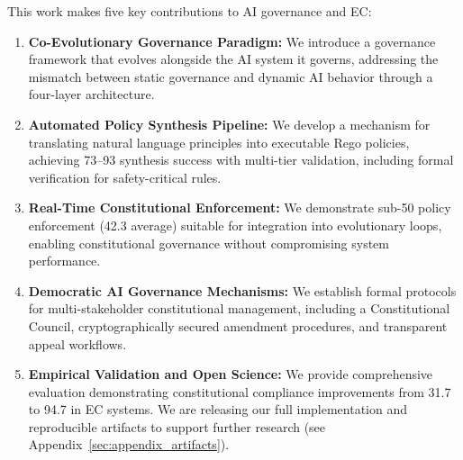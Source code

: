 This work makes five key contributions to AI governance and EC\@:
\begin{enumerate}[leftmargin=*,topsep=2pt,itemsep=2pt,parsep=0pt]
    \item \textbf{Co-Evolutionary Governance Paradigm:} We introduce a governance framework that evolves alongside the AI system it governs, addressing the mismatch between static governance and dynamic AI behavior through a four-layer architecture.
    \item \textbf{Automated Policy Synthesis Pipeline:} We develop a mechanism for translating natural language principles into executable Rego policies, achieving 73--93\percent{} synthesis success with multi-tier validation, including formal verification for safety-critical rules.
    \item \textbf{Real-Time Constitutional Enforcement:} We demonstrate sub-50\ms{} policy enforcement (42.3\ms{} average) suitable for integration into evolutionary loops, enabling constitutional governance without compromising system performance.
    \item \textbf{Democratic AI Governance Mechanisms:} We establish formal protocols for multi-stakeholder constitutional management, including a Constitutional Council, cryptographically secured amendment procedures, and transparent appeal workflows.
    \item \textbf{Empirical Validation and Open Science:} We provide comprehensive evaluation demonstrating constitutional compliance improvements from 31.7\percent{} to 94.7\percent{} in EC systems. We are releasing our full implementation and reproducible artifacts to support further research (see Appendix~\ref{sec:appendix_artifacts}).
\end{enumerate}
